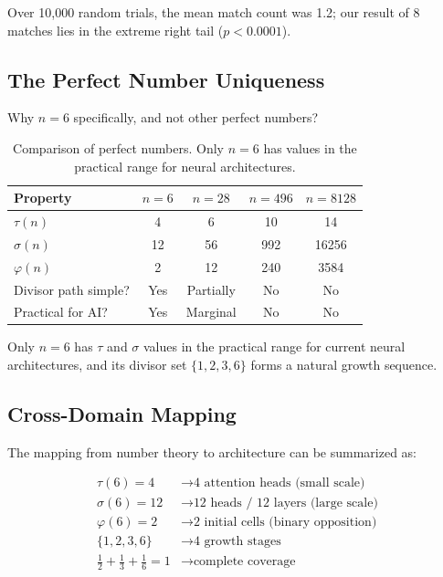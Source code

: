 \documentclass[12pt]{article}
\begin{document}
Over 10,000 random trials, the mean match count was 1.2; our result of 8 matches lies in the extreme right tail ($p < 0.0001$).

\subsection{The Perfect Number Uniqueness}

Why $n = 6$ specifically, and not other perfect numbers?

\begin{table}[h]
\centering
\begin{tabular}{lcccc}
\toprule
Property & $n=6$ & $n=28$ & $n=496$ & $n=8128$ \\
\midrule
$\tau(n)$ & 4 & 6 & 10 & 14 \\
$\sigma(n)$ & 12 & 56 & 992 & 16256 \\
$\varphi(n)$ & 2 & 12 & 240 & 3584 \\
Divisor path simple? & Yes & Partially & No & No \\
Practical for AI? & Yes & Marginal & No & No \\
\bottomrule
\end{tabular}
\caption{Comparison of perfect numbers. Only $n=6$ has values in the practical range for neural architectures.}
\label{tab:perfect}
\end{table}

Only $n = 6$ has $\tau$ and $\sigma$ values in the practical range for current neural architectures, and its divisor set $\{1, 2, 3, 6\}$ forms a natural growth sequence.

\subsection{Cross-Domain Mapping}

The mapping from number theory to architecture can be summarized as:

\begin{align}
\tau(6) = 4 &\longrightarrow \text{4 attention heads (small scale)} \\
\sigma(6) = 12 &\longrightarrow \text{12 heads / 12 layers (large scale)} \\
\varphi(6) = 2 &\longrightarrow \text{2 initial cells (binary opposition)} \\
\{1,2,3,6\} &\longrightarrow \text{4 growth stages} \\
\tfrac{1}{2}+\tfrac{1}{3}+\tfrac{1}{6} = 1 &\longrightarrow \text{complete coverage}
\end{align}
\end{document}
